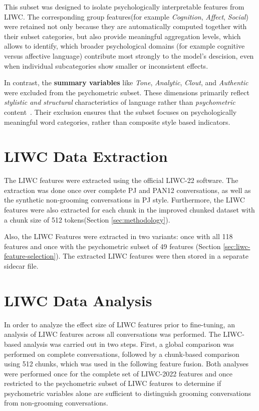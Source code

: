 This subset was designed to isolate psychologically interpretable features from LIWC. The corresponding group features(for example \textit{Cognition}, \textit{Affect}, \textit{Social}) were retained not only because they are automatically computed together with their subset categories, but also provide meaningful aggregation levels, which allows to identify, which broader psychological domains (for example cognitive versus affective language) contribute most strongly to the model's descision, even when individual subcategories show smaller or inconsistent effects. 

In contrast, the \textbf{summary variables} like \textit{Tone}, \textit{Analytic}, \textit{Clout}, and \textit{Authentic} were excluded from the psychometric subset. These dimensions primarily reflect \textit{stylistic and structural} characteristics of language rather than \textit{psychometric} content~\cite{pennebaker2022liwc,tausczik2010psychological}. 
Their exclusion ensures that the subset focuses on psychologically meaningful word categories, rather than composite style based indicators. 


\section{LIWC Data Extraction}
The LIWC features were extracted using the official LIWC-22 software. The extraction was done once over complete PJ and PAN12 conversations, as well as the synthetic non-grooming conversations in PJ style. Furthermore, the LIWC features were also extracted for each chunk in the improved chunked dataset with a chunk size of 512 tokens(Section \ref{sec:methodology}).

Also, the LIWC Features were extracted in two variants: once with all 118 features and once with the psychometric subset of 49 features (Section \ref{sec:liwc-feature-selection}). The extracted LIWC features were then stored in a separate sidecar file.

\section{LIWC Data Analysis}

In order to analyze the effect size of LIWC features prior to fine-tuning, an analysis of LIWC features across all conversations was performed.
The LIWC-based analysis was carried out in two steps. First, a global comparison was performed on complete conversations, followed by a chunk-based comparison using 512 chunks, which was used in the following feature fusion. Both analyses were performed once for the complete set of LIWC-2022 features and once restricted to the psychometric subset of LIWC features to determine if psychometric variables alone are sufficient to distinguish grooming conversations from non-grooming conversations.

